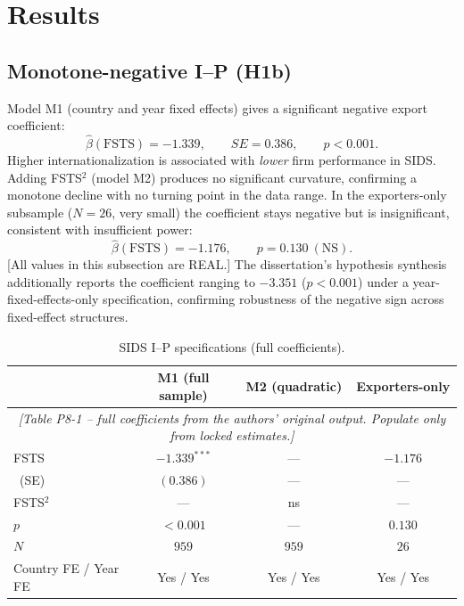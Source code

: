 \documentclass[12pt,a4paper]{article}
\begin{document}
\section{Results}
\subsection{Monotone-negative I--P (H1b)}
Model M1 (country and year fixed effects) gives a significant negative export
coefficient:
\[
\hat{\beta}(\mathrm{FSTS}) = -1.339,\qquad SE = 0.386,\qquad p < 0.001.
\]
Higher internationalization is associated with \emph{lower} firm performance
in SIDS. Adding FSTS$^2$ (model M2) produces no significant curvature,
confirming a monotone decline with no turning point in the data range. In the
exporters-only subsample ($N = 26$, very small) the coefficient stays negative
but is insignificant, consistent with insufficient power:
\[
\hat{\beta}(\mathrm{FSTS}) = -1.176,\qquad p = 0.130\ (\text{NS}).
\]
[All values in this subsection are REAL.] The dissertation's hypothesis
synthesis additionally reports the coefficient ranging to
$-3.351$ ($p<0.001$) under a year-fixed-effects-only specification, confirming
robustness of the negative sign across fixed-effect structures.

\begin{table}[H]
\centering
\caption{SIDS I--P specifications (full coefficients).}
\begin{tabularx}{\textwidth}{Xccc}
\toprule
 & M1 (full sample) & M2 (quadratic) & Exporters-only \\
\midrule
\multicolumn{4}{c}{\itshape [Table P8-1 -- full coefficients from the authors'
original output. Populate only from locked estimates.]}\\
FSTS            & $-1.339^{***}$ & --- & $-1.176$ \\
\ (SE)          & $(0.386)$ & --- & --- \\
FSTS$^2$        & --- & ns & --- \\
$p$             & $<0.001$ & --- & $0.130$ \\
$N$             & $959$ & $959$ & $26$ \\
Country FE / Year FE & Yes / Yes & Yes / Yes & Yes / Yes \\
\bottomrule
\end{tabularx}
\end{table}
\end{document}
